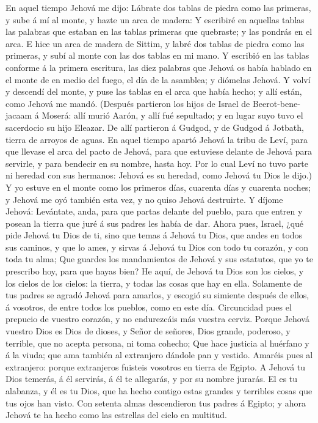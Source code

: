  En aquel tiempo Jehová me dijo: Lábrate dos tablas de
piedra como las primeras, y sube á mí al monte, y hazte un arca de
madera:  Y escribiré en aquellas tablas las palabras que
estaban en las tablas primeras que quebraste; y las pondrás en el arca.
 E hice un arca de madera de Sittim, y labré dos tablas de
piedra como las primeras, y subí al monte con las dos tablas en mi mano.
 Y escribió en las tablas conforme á la primera escritura,
las diez palabras que Jehová os había hablado en el monte de en medio
del fuego, el día de la asamblea; y diómelas Jehová.  Y
volví y descendí del monte, y puse las tablas en el arca que había
hecho; y allí están, como Jehová me mandó.  (Después
partieron los hijos de Israel de Beerot-bene-jacaam á Moserá: allí murió
Aarón, y allí fué sepultado; y en lugar suyo tuvo el sacerdocio su hijo
Eleazar.  De allí partieron á Gudgod, y de Gudgod á
Jotbath, tierra de arroyos de aguas.  En aquel tiempo
apartó Jehová la tribu de Leví, para que llevase el arca del pacto de
Jehová, para que estuviese delante de Jehová para servirle, y para
bendecir en su nombre, hasta hoy.  Por lo cual Leví no
tuvo parte ni heredad con sus hermanos: Jehová es su heredad, como
Jehová tu Dios le dijo.)  Y yo estuve en el monte como
los primeros días, cuarenta días y cuarenta noches; y Jehová me oyó
también esta vez, y no quiso Jehová destruirte.  Y díjome
Jehová: Levántate, anda, para que partas delante del pueblo, para que
entren y posean la tierra que juré á sus padres les había de dar.
 Ahora pues, Israel, ¿qué pide Jehová tu Dios de ti, sino
que temas á Jehová tu Dios, que andes en todos sus caminos, y que lo
ames, y sirvas á Jehová tu Dios con todo tu corazón, y con toda tu alma;
 Que guardes los mandamientos de Jehová y sus estatutos,
que yo te prescribo hoy, para que hayas bien?  He aquí,
de Jehová tu Dios son los cielos, y los cielos de los cielos: la tierra,
y todas las cosas que hay en ella.  Solamente de tus
padres se agradó Jehová para amarlos, y escogió su simiente después de
ellos, á vosotros, de entre todos los pueblos, como en este día.
 Circuncidad pues el prepucio de vuestro corazón, y no
endurezcáis más vuestra cerviz.  Porque Jehová vuestro
Dios es Dios de dioses, y Señor de señores, Dios grande, poderoso, y
terrible, que no acepta persona, ni toma cohecho;  Que
hace justicia al huérfano y á la viuda; que ama también al extranjero
dándole pan y vestido.  Amaréis pues al extranjero:
porque extranjeros fuisteis vosotros en tierra de Egipto.
 A Jehová tu Dios temerás, á él servirás, á él te
allegarás, y por su nombre jurarás.  El es tu alabanza, y
él es tu Dios, que ha hecho contigo estas grandes y terribles cosas que
tus ojos han visto.  Con setenta almas descendieron tus
padres á Egipto; y ahora Jehová te ha hecho como las estrellas del cielo
en multitud.

